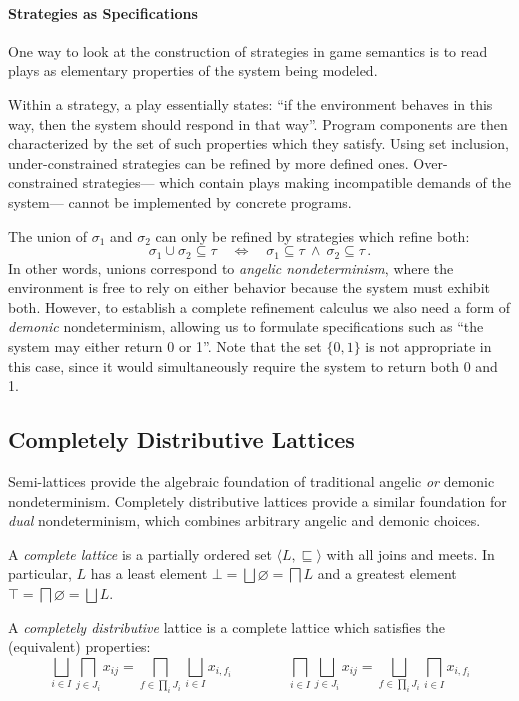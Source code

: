 \documentclass[acmsmall,review,anonymous]{acmart}\settopmatter{printfolios=true,printccs=false,printacmref=false}
\begin{document}

\paragraph{Strategies as Specifications}

One way to look at the construction of strategies
in game semantics
is to read plays as elementary properties
of the system being modeled.

Within a strategy,
a play essentially states:
``if the environment behaves in this way,
then the system should respond in that way''.
Program components are then characterized by
the set of such properties which they satisfy.
Using set inclusion,
under-constrained strategies can be refined by
more defined ones.
Over-constrained strategies---%
which contain plays
making incompatible demands of the system---%
cannot be implemented by concrete programs.

The union of $\sigma_1$ and $\sigma_2$
can only be refined by strategies which refine both:
\[
  \sigma_1 \cup \sigma_2 \subseteq \tau
  \quad\Leftrightarrow\quad
  \sigma_1 \subseteq \tau \:\wedge\:
  \sigma_2 \subseteq \tau
  \,.
\]
In other words,
unions correspond to \emph{angelic nondeterminism},
where the environment is free to rely on either behavior
because the system must exhibit both.
However,
to establish a complete refinement calculus
we also need a form of \emph{demonic} nondeterminism,
allowing us to formulate specifications such as
``the system may either return 0 or 1''.
Note that the set $\{0, 1\}$ is not appropriate in this case,
since it would simultaneously require the system
to return both 0 and 1.


\subsection{Completely Distributive Lattices} %

Semi-lattices provide the algebraic foundation
of traditional angelic \emph{or} demonic nondeterminism.
Completely distributive lattices
provide a similar foundation for
\emph{dual} nondeterminism,
which combines arbitrary angelic and demonic choices.

\begin{definition}
A \emph{complete lattice}
is a partially ordered set $\langle L, {\sqsubseteq} \rangle$
with all joins and meets.
In particular, $L$
has a least element $\bot = \bigsqcup \varnothing = \bigsqcap L$
and a greatest element $\top = \bigsqcap \varnothing = \bigsqcup L$.

A \emph{completely distributive} lattice
is a complete lattice which satisfies
the (equivalent) properties:
\[
  \bigsqcup_{i \in I} \bigsqcap_{j \in J_i} x_{ij} =
  \bigsqcap_{f \in \prod_i J_i} \bigsqcup_{i \in I} x_{i,f_i}
  \qquad\qquad
  \bigsqcap_{i \in I} \bigsqcup_{j \in J_i} x_{ij} =
  \bigsqcup_{f \in \prod_i J_i} \bigsqcap_{i \in I} x_{i,f_i}
\]
\end{definition}
\end{document}

